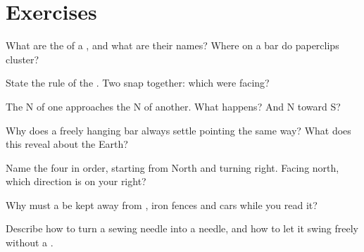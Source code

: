 \section{Exercises}

\begin{exercise}[$\star$]\label{exo:g4:magnets-and-compass:1}
What are the  of a , and what are their names? Where on
a bar  do paperclips cluster?
\end{exercise}

\begin{exercise}[$\star$]\label{exo:g4:magnets-and-compass:2}
State the rule of the . Two  snap together: which 
were facing?
\end{exercise}

\begin{exercise}[$\star$]\label{exo:g4:magnets-and-compass:3}
The N  of one  approaches the N  of another. What
happens? And N toward S?
\end{exercise}

\begin{exercise}[$\star$]\label{exo:g4:magnets-and-compass:4}
Why does a freely hanging bar  always settle pointing the
same way? What does this reveal about the Earth?
\end{exercise}

\begin{exercise}[$\star$]\label{exo:g4:magnets-and-compass:5}
Name the four  in order, starting from North and
turning right. Facing north, which direction is on your right?
\end{exercise}

\begin{exercise}[$\star$]\label{exo:g4:magnets-and-compass:6}
Why must a  be kept away from , iron fences and cars
while you read it?
\end{exercise}

\begin{exercise}[$\star$]\label{exo:g4:magnets-and-compass:7}
Describe how to turn a sewing needle into a  needle, and how
to let it swing freely without a .
\end{exercise}

